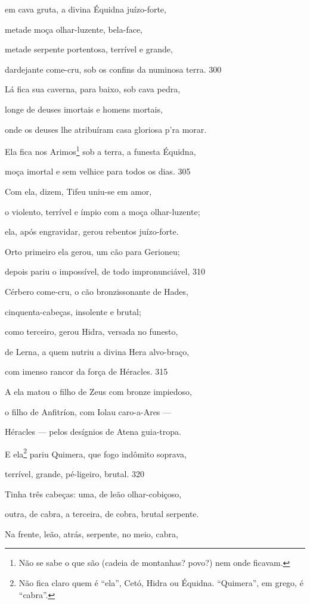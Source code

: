 em cava gruta, a divina Équidna juízo-forte,

metade moça olhar-luzente, bela-face,

metade serpente portentosa, terrível e grande,

dardejante come-cru, sob os confins da numinosa terra. \num{300}

Lá fica sua caverna, para baixo, sob cava pedra,

longe de deuses imortais e homens mortais,

onde os deuses lhe atribuíram casa gloriosa p'ra morar.

\quad{}Ela fica nos Arimos\footnote{Não se sabe o que são (cadeia de montanhas? povo?) nem onde ficavam.} sob a terra, a funesta Équidna,

moça imortal e sem velhice para todos os dias. \num{305}

Com ela, dizem, Tifeu uniu-se em amor,

o violento, terrível e ímpio com a moça olhar-luzente;

ela, após engravidar, gerou rebentos juízo-forte.

Orto primeiro ela gerou, um cão para Gerioneu;

depois pariu o impossível, de todo impronunciável, \num{310}

Cérbero come-cru, o cão bronzissonante de Hades,

cinquenta-cabeças, insolente e brutal;

como terceiro, gerou Hidra, versada no funesto,

de Lerna, a quem nutriu a divina Hera alvo-braço,

com imenso rancor da força de Héracles. \num{315}

A ela matou o filho de Zeus com bronze impiedoso,

o filho de Anfitríon, com Iolau caro-a-Ares ---

Héracles --- pelos desígnios de Atena guia-tropa.

E ela\footnote{Não fica claro quem é ``ela'', Cetó, Hidra ou Équidna. ``Quimera'',
em grego, é ``cabra''.} pariu Quimera, que fogo indômito soprava,

terrível, grande, pé-ligeiro, brutal. \num{320}

Tinha três cabeças: uma, de leão olhar-cobiçoso,

outra, de cabra, a terceira, de cobra, brutal serpente.

Na frente, leão, atrás, serpente, no meio, cabra,

